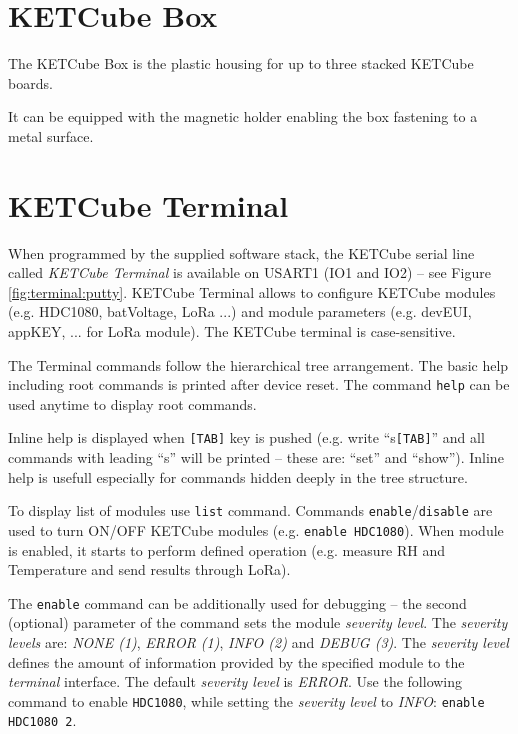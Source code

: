 \documentclass[twoside,a4paper]{refart}
\begin{document}
\section{KETCube Box}

 The KETCube Box is the plastic housing for up to three stacked KETCube boards.
 
 It can be equipped with the magnetic holder enabling the box fastening to a metal surface.

\clearpage
\section{KETCube Terminal}
When programmed by the supplied software stack, the KETCube serial line called {\it KETCube Terminal} is available on USART1 (IO1 and IO2) -- see Figure \ref{fig:terminal:putty}. KETCube Terminal allows to configure KETCube modules (e.g. HDC1080, batVoltage, LoRa ...) and module parameters (e.g. devEUI, appKEY, ... for LoRa module). The KETCube terminal is case-sensitive.

The Terminal commands follow the hierarchical tree arrangement. The basic help including root commands is printed after device reset. The command {\tt help} can be used anytime to display root commands.

Inline help is displayed when {\tt [TAB]} key is pushed (e.g. write “s{\tt [TAB]}” and all commands with leading “s” will be printed -- these are: “set” and “show”). Inline help is usefull especially for commands hidden deeply in the tree structure.

To display list of modules use {\tt list} command. Commands {\tt enable}/{\tt disable} are used to turn ON/OFF KETCube modules (e.g. {\tt enable HDC1080}). When module is enabled, it starts to perform defined operation (e.g. measure RH and Temperature and send results through LoRa). 

The {\tt enable} command can be additionally used for debugging -- the second (optional) parameter of the command sets the module {\it severity level}. The {\it severity levels} are: {\it NONE (1)}, {\it ERROR (1)}, {\it INFO (2)} and {\it DEBUG (3)}. The {\it severity level} defines the amount of information provided by the specified module to the {\it terminal} interface. The default  {\it severity level} is {\it ERROR}. Use the following command to enable {\tt HDC1080}, while setting the {\it severity level} to {\it INFO}: {\tt enable HDC1080 2}.
\end{document}
